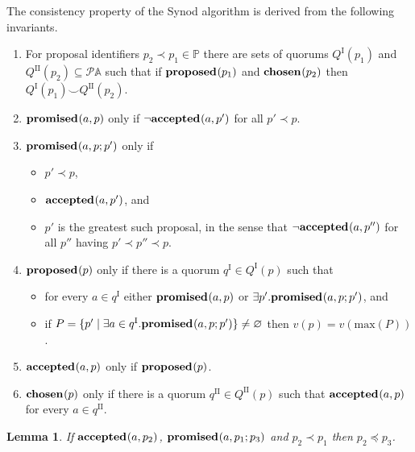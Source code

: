 \documentclass[journal]{IEEEtran}
\newtheorem{lemma}[theorem]{Lemma}
\begin{document}
The consistency property of the Synod algorithm is derived from the following
invariants.

\begin{enumerate}

\item \label{synod-quorums} For proposal identifiers $p_2 \prec p_1 \in \mathbb
P$ there are sets of quorums $Q^\textrm{I}(p_1)$ and
$Q^\textrm{II}(p_2) \subseteq \mathcal P \mathbb A$ such that if $\mathbf{proposed}_{}(p_1)$
and $\mathbf{chosen}_{}(p_2)$ then ${Q^\textrm{I}(p_1) \smile Q^\textrm{II}(p_2)}$.

\item \label{synod-fprom} $\mathbf{promised}_{}(a,p)$ only if $\neg\mathbf{accepted}_{}(a,p')$ for all
${p' \prec p}$.

\item \label{synod-bprom} $\mathbf{promised}_{}(a,p;p')$ only if
\begin{itemize}
\item $p' \prec p$,
\item $\mathbf{accepted}_{}(a,p')$, and
\item $p'$ is the greatest such proposal, in the sense that
$\neg\mathbf{accepted}_{}(a,p'')$ for all $p''$ having $p' \prec p'' \prec p$.
\end{itemize}

\item \label{synod-prop} $\mathbf{proposed}_{}(p)$ only if there is a quorum $q^\textrm{I}
\in Q^\textrm{I}(p)$ such that
\begin{itemize}
\item for every $a \in q^\textrm{I}$ either $\mathbf{promised}_{}(a,p)$ or $\exists p'.
\mathbf{promised}_{}(a,p;p')$, and
\item if $P = \{ p' \mid \exists a \in q^\textrm{I}. \mathbf{promised}_{}(a,p;p') \}
\ne \varnothing$ then $v(p) = v(\mathrm{max}(P))$.
\end{itemize}

\item \label{synod-acc} $\mathbf{accepted}_{}(a,p)$ only if $\mathbf{proposed}_{}(p)$.

\item \label{synod-chosen} $\mathbf{chosen}_{}(p)$ only if there is a quorum
$q^\textrm{II} \in Q^\textrm{II}(p)$ such that $\mathbf{accepted}_{}(a,p)$ for every $a \in
q^\textrm{II}$.

\end{enumerate}

\begin{lemma}\label{synod-acc-bprom}If $\mathbf{accepted}_{}(a,p_2)$, $\mathbf{promised}_{}(a,p_1;p_3)$
and $p_2 \prec p_1$ then $p_2 \preceq p_3$.\end{lemma}
\end{document}
